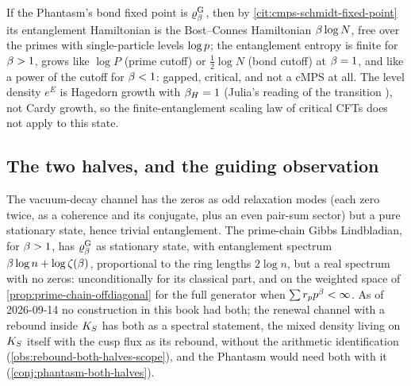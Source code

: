 \begin{observation}
\label{obs:gibbs-entanglement-hagedorn}
If the Phantasm's bond fixed point is $\varrho^{\mathrm{G}}_{\beta}$, then by
\cref{cit:cmps-schmidt-fixed-point} its entanglement Hamiltonian is the Bost--Connes
Hamiltonian $\beta\log N$, free over the primes with single-particle levels $\log p$;
the entanglement entropy is finite for $\beta>1$, grows like $\log P$ (prime cutoff)
or $\tfrac12\log N$ (bond cutoff) at $\beta=1$, and like a power of the cutoff for
$\beta<1$: gapped, critical, and not a cMPS at all. The level density $e^E$ is
Hagedorn growth with $\beta_H = 1$ (Julia's reading of the transition
\cite{julia1990statistical}), not Cardy growth, so the finite-entanglement scaling law of
critical CFTs does not apply to this state.
\end{observation}

\subsection{The two halves, and the guiding observation}

\begin{observation}
\label{obs:complementary-halves}
The vacuum-decay channel has the zeros as odd relaxation modes (each zero twice, as a
coherence and its conjugate, plus an even pair-sum sector) but a pure stationary state,
hence trivial entanglement. The prime-chain Gibbs Lindbladian, for $\beta>1$, has
$\varrho^{\mathrm{G}}_{\beta}$ as stationary state, with entanglement spectrum $\beta\log n +
\log\zeta(\beta)$, proportional to the ring lengths $2\log n$, but a real spectrum with
no zeros: unconditionally for its classical part, and on the weighted space of
\cref{prop:prime-chain-offdiagonal} for the full generator when $\sum r_{p}p^{\beta}
<\infty$. As of 2026-09-14 no construction in this book had both; the renewal channel with a
rebound inside $K_S$ has both as a spectral statement, the mixed density living on $K_S$ itself with the cusp flux as
its rebound, without the arithmetic identification (\cref{obs:rebound-both-halves-scope}), and the Phantasm would need both with it
(\cref{conj:phantasm-both-halves}).
\end{observation}


